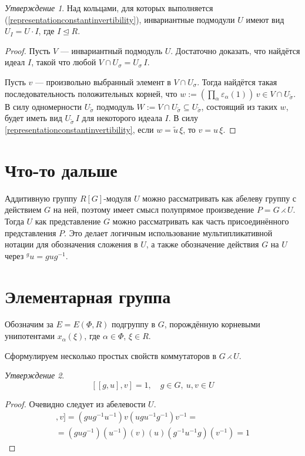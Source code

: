 \documentclass[10pt]{article}
\theoremstyle{remark}
\newtheorem{prop}{Утверждение}
\begin{document}
\begin{prop}\label{unipotentsubgroups}
Над кольцами, для которых выполняется (\ref{representationconstantinvertibility}), инвариантные подмодули $U$ имеют вид $U_I = U \cdot I$, где $I \trianglelefteq R$.
\end{prop}
\begin{proof}
Пусть $V$ --- инвариантный подмодуль $U$. Достаточно доказать, что найдётся идеал $I$, такой что любой $V \cap U_\sigma = U_\sigma \, I$.

Пусть $v$ --- произвольно выбранный элемент в $V \cap U_\sigma$. Тогда найдётся такая последовательность положительных корней, что $w := \left(\prod_{\alpha}\varepsilon_\alpha(1)\right) \, v \in V \cap U_{\widetilde\sigma}$. В силу одномерности $U_{\widetilde\sigma}$ подмодуль $W := V \cap U_{\widetilde\sigma} \subseteq U_{\widetilde\sigma}$, состоящий из таких $w$, будет иметь вид $U_{\widetilde\sigma} \, I$ для некоторого идеала $I$. В силу \ref{representationconstantinvertibility}, если $w = \widetilde u \, \xi$, то $v = u \, \xi$.
\end{proof}


\section{Что-то дальше}

Аддитивную группу $R[G]$-модуля $U$ можно рассматривать как абелеву группу с действием $G$ на ней, поэтому
имеет смысл полупрямое произведение $P = G \rightthreetimes U$.
Тогда $U$ как представление $G$ можно рассматривать как часть присоединённого представления $P$. Это делает логичным использование мультипликативной нотации для обозначения сложения в $U$, а также обозначение действия $G$ на $U$ через $^{g}u = g u g^{-1}$. 

\section{Элементарная группа}

Обозначим за $E = E(\Phi,R)$ подгруппу в $G$, порождённую корневыми унипотентами $x_\alpha(\xi)$, где $\alpha \in \Phi$, $\xi \in R$.

Сформулируем несколько простых свойств коммутаторов в $G \rightthreetimes U$.

\begin{prop}
  $$[[g,u],v] = 1, \quad g \in G, \ u,v \in U $$
\end{prop}
\begin{proof}
  Очевидно следует из абелевости $U$.
\begin{align*}
[[g,u],v] = (g u g^{-1} u^{-1}) v (u g u^{-1} g^{-1}) v^{-1} = \\
= (gug^{-1}) (u^{-1}) (v) (u) (g^{-1}u^{-1}g) (v^{-1}) = 1
\end{align*}
\end{proof}
\end{document}
